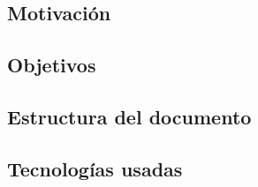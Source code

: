 \documentclass[../main.tex]{subfiles}
\begin{document}
\subsection{Motivación}
\blindtext

\subsection{Objetivos}
\blindtext

\subsection{Estructura del documento}
\blindtext

\subsection{Tecnologías usadas}
\blindtext
\end{document}
